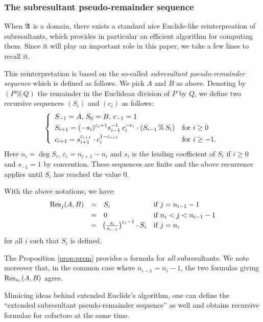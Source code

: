 \documentclass{article}
\begin{document}
\subsubsection*{The subresultant pseudo-remainder sequence}

When $\mathfrak A$ is a domain, there exists a standard nice Euclide-like
reinterpreation of subresultants, which provides in particular an 
efficient algorithm for computing them. Since it will play an important 
role in this paper, we take a few lines to recall it.

This reinterpretation is based on the so-called \emph{subresultant 
pseudo-remainder sequence} which is defined as follows. We pick $A$ and 
$B$ as above. Denoting by $(P \,\%\, Q)$ 
the remainder in the Euclidean division of $P$ by $Q$, we define two 
recursive sequences $(S_i)$ and $(c_i)$ as follows:
\begin{equation}
\label{eq:subressequence}
\left\{\begin{array}{ll}
S_{-1} = A, \, S_0 = B, \, c_{-1} = 1 \smallskip \\
\displaystyle S_{i+1} = (-s_i)^{\varepsilon_i + 1}
s_{i-1}^{-1} \: c_i^{-\varepsilon_i} \cdot (S_{i-1} \,\%\, S_i)
& \text{for } i \geq 0 \smallskip \\
\displaystyle c_{i+1} = s_{i+1}^{\varepsilon_{i+1}} \cdot c_i^{1-\varepsilon_{i+1}}
& \text{for } i \geq -1. 
\end{array}\right.
\end{equation}
Here $n_i = \deg S_i$, $\varepsilon_i = n_{i+1} - n_i$ and $s_i$ is the 
leading coefficient of $S_i$ if $i \geq 0$ and $s_{-1} = 1$ by 
convention. These sequences are finite and the above recurrence applies 
until $S_i$ has reached the value $0$.

\begin{prop}
\label{prop:prem}
With the above notations, we have:
$$\begin{array}{rcll}
\Res_j(A,B) & = & S_i & \text{if } j = n_{i-1} - 1 \smallskip \\
& = & 0 & \text{if } n_i < j < n_{i-1} - 1 \\
& = & \!\big(\frac{s_i}{s_{i-1}}\big)^{\varepsilon_i-1} \cdot S_i & 
\text{if } j = n_i
\end{array}$$
for all $i$ such that $S_i$ is defined.
\end{prop}

\begin{rem}
The Proposition \ref{prop:prem} provides a formula for \emph{all} 
subresultants. We note moreover that, in the common case where $n_{i-1} 
= n_i - 1$, the two formulas giving $\text{\rm Res}_{n_i}(A,B)$ agree.

Mimicing ideas behind extended Euclide's algorithm, one can define the 
``extended subresultant pseudo-remainder sequence'' as well and obtains
recursive formulae for cofactors at the same time.
\end{rem}
\end{document}
